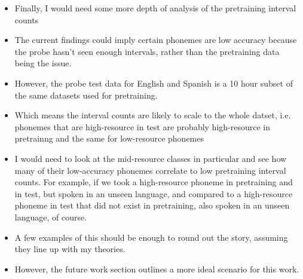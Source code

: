 \begin{itemize}
\begin{itemize}
    \end{itemize}
    \item Finally, I would need some more depth of analysis of the pretraining interval counts
    \item The current findings could imply certain phonemes are low accuracy because the probe hasn't seen enough intervals, rather than the pretraining data being the issue.
    \item However, the probe test data for English and Spanish is a 10 hour subset of the same datasets used for pretraining.
    \item Which means the interval counts are likely to scale to the whole datset, i.e. phonemes that are high-resource in test are probably high-resource in pretrainng and the same for low-resource phonemes
    \item I would need to look at the mid-resource classes in particular and see how many of their low-accuracy phonemes correlate to low pretraining interval counts. For example, if we took a high-resource phoneme in pretraining and in test, but spoken in an unseen language, and compared to a high-resource phoneme in test that did not exist in pretraining, also spoken in an unseen language, of course.
    \item A few examples of this should be enough to round out the story, assuming they line up with my theories.
    \item However, the future work section outlines a more ideal scenario for this work.
\end{itemize}
\fi

